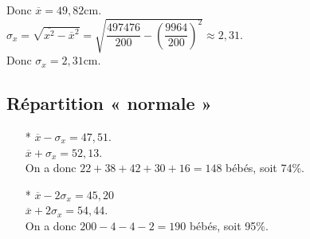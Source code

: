 Donc $\overline{x} = 49,82$cm. \\

$\sigma_x = \sqrt{\overline{x^2} - \overline{x}^2} = \sqrt{\dfrac{497476}{200} - \left(\dfrac{9964}{200}\right)^2} \approx 2,31$. \\

Donc $\sigma_x = 2,31$cm. \\

\subsection{Répartition « normale »}

\begin{itemize}
\item[*] $\overline{x} - \sigma_x = 47,51$. \\ $\overline{x} + \sigma_x = 52,13$. \\On a donc $22 + 38 + 42 + 30 + 16 = 148$ bébés, soit 74\%. 
\\
\item[*] $\overline{x} - 2\sigma_x = 45,20$ \\ $\overline{x} + 2\sigma_x = 54,44$. \\ On a donc $200 - 4 - 4 - 2 = 190$ bébés, soit 95\%. 
\end{itemize}
